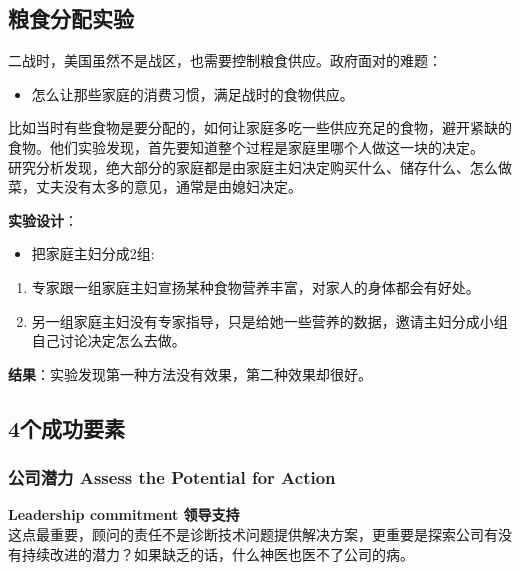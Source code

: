 \hypertarget{ux7caeux98dfux5206ux914dux5b9eux9a8c}{%
\subsection{粮食分配实验}\label{ux7caeux98dfux5206ux914dux5b9eux9a8c}}

二战时，美国虽然不是战区，也需要控制粮食供应。政府面对的难题：

\begin{itemize}
\tightlist
\item
  怎么让那些家庭的消费习惯，满足战时的食物供应。
\end{itemize}

比如当时有些食物是要分配的，如何让家庭多吃一些供应充足的食物，避开紧缺的食物。他们实验发现，首先要知道整个过程是家庭里哪个人做这一块的决定。\\
研究分析发现，绝大部分的家庭都是由家庭主妇决定购买什么、储存什么、怎么做菜，丈夫没有太多的意见，通常是由媳妇决定。

\textbf{实验设计}：

\begin{itemize}
\tightlist
\item
  把家庭主妇分成2组:
\end{itemize}

\begin{enumerate}
\tightlist
\item
  专家跟一组家庭主妇宣扬某种食物营养丰富，对家人的身体都会有好处。
\item
  另一组家庭主妇没有专家指导，只是给她一些营养的数据，邀请主妇分成小组自己讨论决定怎么去做。\\
\end{enumerate}

\textbf{结果}：实验发现第一种方法没有效果，第二种效果却很好。

\hypertarget{ux4e2aux6210ux529fux8981ux7d20}{%
\subsection{4个成功要素}\label{ux4e2aux6210ux529fux8981ux7d20}}


\hypertarget{ux516cux53f8ux6f5cux529b-assess-the-potential-for-action}{%
\subsubsection{公司潜力 Assess the Potential for
Action}\label{ux516cux53f8ux6f5cux529b-assess-the-potential-for-action}}

\textbf{Leadership commitment 领导支持}\\
这点最重要，顾问的责任不是诊断技术问题提供解决方案，更重要是探索公司有没有持续改进的潜力？如果缺乏的话，什么神医也医不了公司的病。

